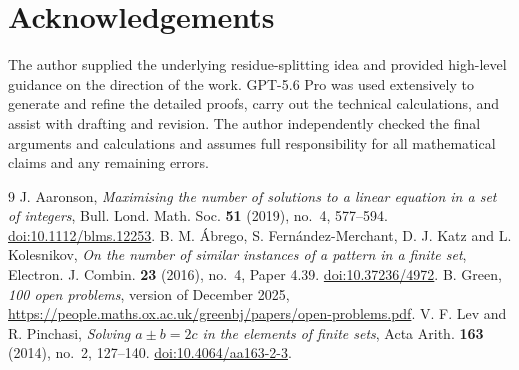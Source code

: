 \documentclass[11pt]{article}
\numberwithin{equation}{section}
\theoremstyle{remark}
\begin{document}
\section*{Acknowledgements}

The author supplied the underlying residue-splitting idea and provided
high-level guidance on the direction of the work. GPT-5.6 Pro
was used extensively to generate and refine the detailed proofs, carry
out the technical calculations, and assist with drafting and revision.
The author independently checked the final arguments and calculations
and assumes full responsibility for all mathematical claims and any
remaining errors.


\begin{thebibliography}{9}
\small
\setlength{\itemsep}{0.25em}
J. Aaronson,
\emph{Maximising the number of solutions to a linear equation in a set of integers},
Bull. Lond. Math. Soc. \textbf{51} (2019), no.~4, 577--594.
\href{https://doi.org/10.1112/blms.12253}{doi:10.1112/blms.12253}.
B. M. \'Abrego, S. Fern\'andez-Merchant, D. J. Katz and L. Kolesnikov,
\emph{On the number of similar instances of a pattern in a finite set},
Electron. J. Combin. \textbf{23} (2016), no.~4, Paper 4.39.
\href{https://doi.org/10.37236/4972}{doi:10.37236/4972}.
B. Green,
\emph{100 open problems}, version of December 2025,
\url{https://people.maths.ox.ac.uk/greenbj/papers/open-problems.pdf}.
V. F. Lev and R. Pinchasi,
\emph{Solving $a\pm b=2c$ in the elements of finite sets},
Acta Arith. \textbf{163} (2014), no.~2, 127--140.
\href{https://doi.org/10.4064/aa163-2-3}{doi:10.4064/aa163-2-3}.
\end{thebibliography}
\end{document}
